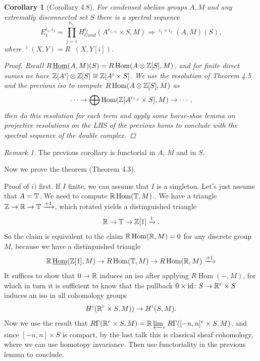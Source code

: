 \documentclass[A4paper, british, reqno]{amsart}
\theoremstyle{darkgreentheorem}
\newtheorem{cor}[thm]{Corollary}
\theoremstyle{darkbluedefinition}
\theoremstyle{darkredexample}
\theoremstyle{remark}
\newtheorem{rem}[thm]{Remark}
\DeclareMathOperator{\Hom}{Hom}
\DeclareMathOperator{\ihom}{\underline{Hom}}
\DeclareMathOperator{\iext}{\underline{Ext}}
\newcommand{\1}{\mathbbm{1}}
\newcommand{\ot}{\otimes}
\newcommand{\id}{\mathrm{id}}
\newcommand{\tms}{\times}
\begin{document}
\begin{cor}[Corollary 4.8]
    For condensed abelian groups $A,M$ and any extremally disconnected set $S$ there is a spectral sequence
    \[ E_{1}^{i_{1},i_{2}}=\prod_{j=1}^{n_{i_{1}}}H^{i_{2}}_{Cond}(A^{r_{i_{1},i_{2}}}\tms S,M)\Rightarrow \iext^{i_{1}+i_{2}}(A,M)(S),\]
    where $\iext^{i}(X,Y)=R\ihom(X,Y[i])$.
    \begin{proof}
	Recall $R\ihom(A,M)(S)=R\Hom(A\ot\Z[S],M)$, and for finite direct sumes we have $\Z[A^{i}]\ot \Z[S]\cong \Z[A^{i}\tms S]$.
	We use the resolution of Theorem 4.5 and the previous iso to compute $R\Hom(A\ot \Z[S],M)$ as
	\[ \cdots \to \bigoplus \Hom(\Z[A^{r_{i,j}}\tms S],M)\to \cdots, \]
	then do this resolution for each term and apply some horse-shoe lemma on projective resolutions on the LHS of the previous homs to conclude with the spectral sequence of the double complex.
    \end{proof}
\end{cor}

\begin{rem}
    The previous corollary is functorial in $A$, $M$ and in $S$.
\end{rem}

Now we prove the theorem (Theorem 4.3).

Proof of $i)$ first.
If $I$ finite, we can assume that $I$ is a singleton.
Let's just assume that $A=\mathbb{T}$.
We need to compute $\R\Hom(\bbT,M)$..
We have a triangle $\mathbb{Z}\to \mathbb{R}\to \mathbb{T}\xrightarrow{+1}$, which rotated yields a distinguished triangle
\[ \mathbb{R}\to \mathbb{T}\to \mathbb{Z}[1]\xrightarrow{1}.\]
So the claim is equivalent to the claim $\R\Hom(\R,M)=0$ for any discrete group $M$, because we have a distinguished triangle
\[ \R\ihom(\Z[1],M)\to R\Hom(\bbT,M)\to R\Hom(\R,M) \xrightarrow{+1}\]
It suffices to show that $0\to \mathbb{R}$ induces an iso after applying $R\Hom(-,M)$, for which in turn it is sufficient to know that the pullback $0\times \id \colon S\to \R^{r}\times S$ induces an iso in all cohomology groups
\[ H^{i}(\mathbb{R}^{r}\times S,M))\to H^{i}(S,M). \]
Now we use the result that $R\Gamma(\R^{r}\tms S,M)=\R\varprojlim_{r}R\Gamma([-n,n]^{r}\tms S,M)$, and since $[-n,n]\tms S$ is compact, by the last talk this is classical sheaf cohomology, where we can use homotopy invariance.
Then use functoriality in the previous lemma to conclude.
\end{document}
